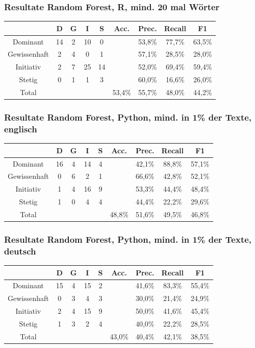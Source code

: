 \documentclass{beamer}
\begin{document}
\begin{frame}
\frametitle{Resultate Random Forest, R, mind. 20 mal Wörter}
\begin{center}
\begin{tabular}{|c|c|c|c|c|c|c|c|c|}
\hline
 &  D 	& G	& I & S	& Acc.	& Prec. & Recall	& F1\\
\hline
Dominant & 14 & 2 & 10& 0 &&53,8\% & 77,7\% & 63,5\% \\
Gewissenhaft & 2 & 4 & 0 & 1&&57,1\% & 28,5\% & 28,0\% \\
Initiativ & 2 & 7  & 25 & 14&&52,0\% & 69,4\% & 59,4\% \\
Stetig & 0 & 1 & 1 &  3&&60,0\% & 16,6\% & 26,0\% \\
\hline
Total 	&		&		& & 		& 53,4\%		&   55,7\% & 48,0\% & 44,2\%\\
\hline
\end{tabular}
\end{center}
\end{frame}
\begin{frame}
\frametitle{Resultate Random Forest, Python, mind. in 1\% der Texte, englisch}
\begin{center}
\begin{tabular}{|c|c|c|c|c|c|c|c|c|}
\hline
 &  D 	& G	& I & S	& Acc.	& Prec. & Recall	& F1\\
\hline
Dominant & 16 & 4 & 14 & 4 &&42,1\% & 88,8\% & 57,1\% \\
Gewissenhaft & 0 & 6 & 2 & 1&&66,6\% & 42,8\% & 52,1\% \\
Initiativ & 1 & 4 & 16 & 9&&53,3\% & 44,4\% & 48,4\% \\
Stetig & 1 & 0 & 4 & 4&&44,4\% & 22,2\% & 29,6\% \\
\hline
Total 	&		&		& & 		& 48,8\%		&    51,6\% & 49,5\% & 46,8\%\\
\hline
\end{tabular}
\end{center}
\end{frame}
\begin{frame}
\frametitle{Resultate Random Forest, Python, mind. in 1\% der Texte, deutsch}
\begin{center}
\begin{tabular}{|c|c|c|c|c|c|c|c|c|}
\hline
 &  D 	& G	& I & S	& Acc.	& Prec. & Recall	& F1\\
\hline
Dominant & 15 & 4 & 15 & 2 &&41,6\% & 83,3\% & 55,4\% \\
Gewissenhaft & 0 & 3 & 4 & 3&&30,0\% & 21,4\% & 24,9\% \\
Initiativ & 2 & 4 & 15 & 9&&50,0\% & 41,6\% & 45,4\% \\
Stetig & 1 & 3 & 2 & 4&&40,0\% & 22,2\% & 28,5\% \\
\hline
Total 	&		&		& & 		& 43,0\%		&    40,4\% & 42,1\% & 38,5\%\\
\hline

\end{tabular}
\end{center}
\end{frame}
\end{document}
